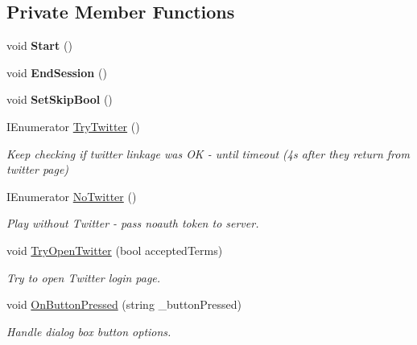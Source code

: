 \subsection*{Private Member Functions}
\begin{DoxyCompactItemize}
\item 
\mbox{\label{class_login_twitter_aa93b8ee84e787d99c171d9086c64275c}} 
void {\bfseries Start} ()
\item 
\mbox{\label{class_login_twitter_ac489a3bf63140ddcc50d9a10f70409d1}} 
void {\bfseries End\+Session} ()
\item 
\mbox{\label{class_login_twitter_a6291e32f19d1cae3ea13e08b5401960f}} 
void {\bfseries Set\+Skip\+Bool} ()
\item 
\mbox{\label{class_login_twitter_a45104792188cdefa496e01daf069a9e9}} 
I\+Enumerator \mbox{\hyperlink{class_login_twitter_a45104792188cdefa496e01daf069a9e9}{Try\+Twitter}} ()
\begin{DoxyCompactList}\small\item\em Keep checking if twitter linkage was OK -\/ until timeout (4s after they return from twitter page) \end{DoxyCompactList}\item 
\mbox{\label{class_login_twitter_af7789cc9f8f7b7b541b7b78ce125944b}} 
I\+Enumerator \mbox{\hyperlink{class_login_twitter_af7789cc9f8f7b7b541b7b78ce125944b}{No\+Twitter}} ()
\begin{DoxyCompactList}\small\item\em Play without Twitter -\/ pass noauth token to server. \end{DoxyCompactList}\item 
\mbox{\label{class_login_twitter_a61c2451a8162c3b5e3e7f4fbec0940c1}} 
void \mbox{\hyperlink{class_login_twitter_a61c2451a8162c3b5e3e7f4fbec0940c1}{Try\+Open\+Twitter}} (bool accepted\+Terms)
\begin{DoxyCompactList}\small\item\em Try to open Twitter login page. \end{DoxyCompactList}\item 
\mbox{\label{class_login_twitter_a93f9df661ee558c415ad4bd1aeea4555}} 
void \mbox{\hyperlink{class_login_twitter_a93f9df661ee558c415ad4bd1aeea4555}{On\+Button\+Pressed}} (string \+\_\+button\+Pressed)
\begin{DoxyCompactList}\small\item\em Handle dialog box button options. \end{DoxyCompactList}\end{DoxyCompactItemize}
